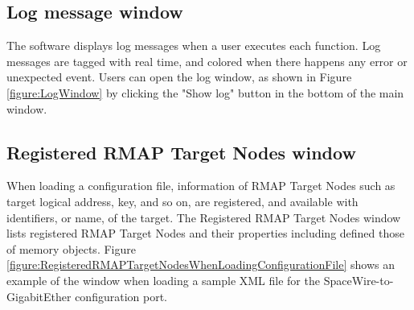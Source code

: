 \documentclass[a4paper,10pt]{article}
\begin{document}
\subsection{Log message window}
The software displays log messages when a user executes each function.
Log messages are tagged with real time, and colored when there happens any error or unexpected event.
Users can open the log window, as shown in Figure \ref{figure:LogWindow} by clicking the "Show log" button in the bottom of the main window.

\subsection{Registered RMAP Target Nodes window}
When loading a configuration file, information of RMAP Target Nodes such as target logical address, key, and so on, are registered, and available with identifiers, or name, of the target.
The Registered RMAP Target Nodes window lists registered RMAP Target Nodes and their properties including defined those of memory objects.
Figure \ref{figure:RegisteredRMAPTargetNodesWhenLoadingConfigurationFile} shows an example of the window when loading a sample XML file for the SpaceWire-to-GigabitEther configuration port.
\end{document}
